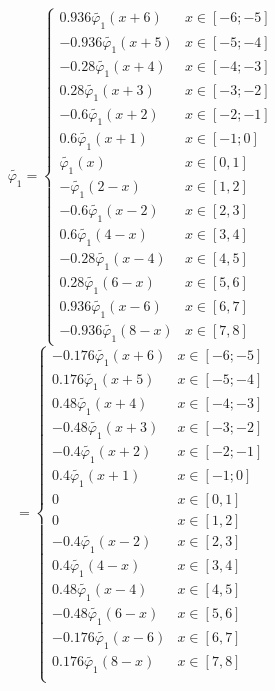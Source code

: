 \documentclass[a4paper, 12pt,fleqn]{extarticle}
\begin{document}
\[
    \tilde{\varphi_1}=
    \begin{cases}
        0.936 \tilde{\varphi_1}(x+6) &x\in[-6;-5]\\
        -0.936 \tilde{\varphi_1}(x+5)&x\in[-5;-4]\\
        -0.28 \tilde{\varphi_1}(x+4)&x\in[-4;-3] \\
        0.28 \tilde{\varphi_1}(x+3)&x\in[-3;-2] \\
        -0.6 \tilde{\varphi_1}(x+2)&x\in[-2;-1]\\
        0.6 \tilde{\varphi_1}(x+1)&x\in[-1;0]\\
        \tilde{\varphi_1}(x)&x\in[0,1]\\
        -\tilde{\varphi_1}(2-x)&x\in[1,2]\\
        -0.6 \tilde{\varphi_1}(x-2)&x\in[2,3]\\
        0.6 \tilde{\varphi_1}(4-x)&x\in[3,4]\\
        -0.28 \tilde{\varphi_1}(x-4)&x\in[4,5] \\
        0.28 \tilde{\varphi_1}(6-x)&x\in[5,6] \\
        0.936 \tilde{\varphi_1}(x-6)&x\in[6,7]\\
        -0.936 \tilde{\varphi_1}(8-x)&x\in[7,8]
    \end{cases}\]
    \[
        =
        \begin{cases}
           -0.176 \tilde{\varphi_1}(x+6) &x\in[-6;-5]\\
           0.176 \tilde{\varphi_1}(x+5)&x\in[-5;-4]\\
           0.48 \tilde{\varphi_1}(x+4) &x\in[-4;-3] \\
           -0.48 \tilde{\varphi_1}(x+3)&x\in[-3;-2] \\
           -0.4 \tilde{\varphi_1}(x+2) &x\in[-2;-1]\\
           0.4 \tilde{\varphi_1}(x+1) &x\in[-1;0]\\
           0&x\in[0,1]\\
           0&x\in[1,2]\\
           -0.4 \tilde{\varphi_1}(x-2)&x\in[2,3]\\
           0.4 \tilde{\varphi_1}(4-x)&x\in[3,4]\\
           0.48 \tilde{\varphi_1}(x-4)&x\in[4,5] \\
           -0.48 \tilde{\varphi_1}(6-x)&x\in[5,6] \\
           -0.176 \tilde{\varphi_1}(x-6)&x\in[6,7]\\
           0.176 \tilde{\varphi_1}(8-x)&x\in[7,8]\\
        \end{cases}\]
\end{document}
